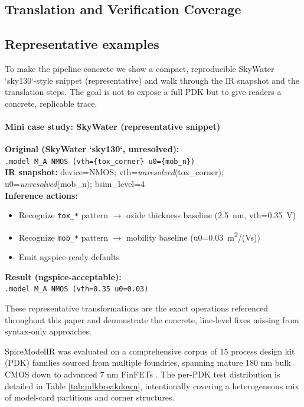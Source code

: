 \documentclass[conference]{IEEEtran}
\begin{document}
\subsection{Translation and Verification Coverage}
\subsection{Representative examples}
To make the pipeline concrete we show a compact, reproducible SkyWater `sky130`-style snippet (representative) and walk through the IR snapshot and the translation steps. The goal is not to expose a full PDK but to give readers a concrete, replicable trace.

\paragraph{Mini case study: SkyWater (representative snippet)}\label{sec:mini_case}
\vspace{0.1cm}
\noindent\textbf{Original (SkyWater `sky130`, unresolved):}\\[0.1cm]
\texttt{\small .model M\_A NMOS (vth=\{tox\_corner\} u0=\{mob\_n\})}\\[0.2cm]
\noindent\textbf{IR snapshot:} device=NMOS; vth=\emph{unresolved}(tox\_corner); u0=\emph{unresolved}(mob\_n); bsim\_level=4\\[0.2cm]
\noindent\textbf{Inference actions:}\\[-0.3cm]
\begin{itemize}[nosep, topsep=0pt]
\item Recognize \texttt{tox\_*} pattern $\rightarrow$ oxide thickness baseline (2.5~nm, vth=0.35~V)
\item Recognize \texttt{mob\_*} pattern $\rightarrow$ mobility baseline (u0=0.03~m\textsuperscript{2}/(V\cdot s))
\item Emit ngspice-ready defaults
\end{itemize}
\noindent\textbf{Result (ngspice-acceptable):}\\[0.1cm]
\texttt{\small .model M\_A NMOS (vth=0.35 u0=0.03)}

These representative transformations are the exact operations referenced throughout this paper and demonstrate the concrete, line-level fixes missing from syntax-only approaches.

SpiceModelIR was evaluated on a comprehensive corpus of 15 process design kit (PDK) families sourced from multiple foundries, spanning mature 180 nm bulk CMOS down to advanced 7 nm FinFETs \cite{Clark_2016, Edwards_OpenPDK, SkyWater_2023, GlobalFoundries_2023}. The per-PDK test distribution is detailed in Table \ref{tab:pdkbreakdown}, intentionally covering a heterogeneous mix of model-card partitions and corner structures. 
\end{document}
